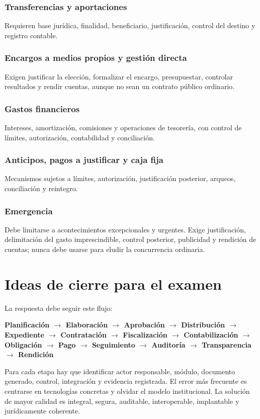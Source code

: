 \documentclass[11pt,a4paper]{article}
\begin{document}
\subsubsection{Transferencias y aportaciones}
Requieren base jurídica, finalidad, beneficiario, justificación, control del destino y registro contable.

\subsubsection{Encargos a medios propios y gestión directa}
Exigen justificar la elección, formalizar el encargo, presupuestar, controlar resultados y rendir cuentas, aunque no sean un contrato público ordinario.

\subsubsection{Gastos financieros}
Intereses, amortización, comisiones y operaciones de tesorería, con control de límites, autorización, contabilidad y conciliación.

\subsubsection{Anticipos, pagos a justificar y caja fija}
Mecanismos sujetos a límites, autorización, justificación posterior, arqueos, conciliación y reintegro.

\subsubsection{Emergencia}
Debe limitarse a acontecimientos excepcionales y urgentes. Exige justificación, delimitación del gasto imprescindible, control posterior, publicidad y rendición de cuentas; nunca debe usarse para eludir la concurrencia ordinaria.

\section{Ideas de cierre para el examen}

La respuesta debe seguir este flujo:
\begin{center}
\Large\bfseries\color{navy}
Planificación $\rightarrow$ Elaboración $\rightarrow$ Aprobación $\rightarrow$ Distribución $\rightarrow$ Expediente $\rightarrow$ Contratación $\rightarrow$ Fiscalización $\rightarrow$ Contabilización $\rightarrow$ Obligación $\rightarrow$ Pago $\rightarrow$ Seguimiento $\rightarrow$ Auditoría $\rightarrow$ Transparencia $\rightarrow$ Rendición
\end{center}

Para cada etapa hay que identificar actor responsable, módulo, documento generado, control, integración y evidencia registrada. El error más frecuente es centrarse en tecnologías concretas y olvidar el modelo institucional. La solución de mayor calidad es integral, segura, auditable, interoperable, implantable y jurídicamente coherente.
\end{document}
